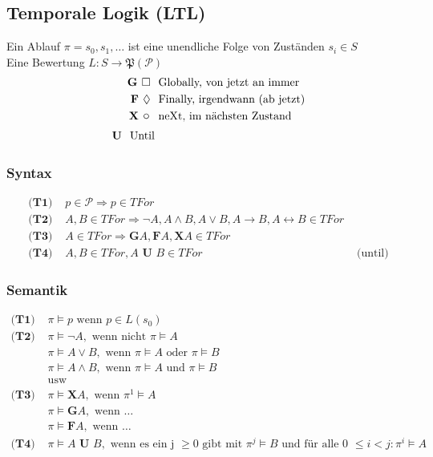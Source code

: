 \documentclass{article}
\begin{document}
		\subsection*{Temporale Logik (LTL)}
			Ein Ablauf $\pi = s_0, s_1, \ldots$ ist eine unendliche Folge von Zust\"anden $s_i \in S$\\
			Eine Bewertung $L: S \rightarrow \mathfrak{P}(\mathcal{P})$
				\begin{align*}
					\textbf{G $\Box$ } & \text{ Globally, von jetzt an immer}\\
					\textbf{F $\Diamond$ } & \text{ Finally, irgendwann (ab jetzt)}\\
					\textbf{X \large{$\circ$} } & \text{ neXt, im n\"achsten Zustand}\\
					\textbf{U } \text{ Until}
				\end{align*}
				\subsubsection*{Syntax}
					\begin{align*}
						\textbf{(T1) } & p \in \mathcal{P} \Rightarrow p \in TFor\\
						\textbf{(T2) } & A, B \in TFor \Rightarrow \neg A, A \wedge B, A \vee B, A \rightarrow B, A \leftrightarrow B \in TFor\\
						\textbf{(T3) } & A \in TFor \Rightarrow \textbf{G}A, \textbf{F}A, \textbf{X}A \in TFor\\
						\textbf{(T4) } & A, B \in TFor, A \textbf{ U } B \in TFor & \text{ (until)}
					\end{align*}
				\subsubsection*{Semantik}
					\begin{align*}
						\textbf{(T1) } & \pi \models p \text{ wenn } p \in L(s_0)\\
						\textbf{(T2) } & \pi \models \neg A, \text{ wenn nicht } \pi \models A\\
						& \pi \models A \vee B, \text{ wenn } \pi \models A \text{ oder } \pi \models B\\
						& \pi \models A \wedge B, \text{ wenn } \pi \models A \text{ und } \pi \models B\\
						& \text{usw}\\
						\textbf{(T3) } & \pi \models \textbf{X}A, \text{ wenn } \pi^1 \models A\\
						& \pi \models \textbf{G}A, \text{ wenn } \ldots\\
						& \pi \models \textbf{F}A, \text{ wenn } \ldots\\
						\textbf{(T4) } & \pi \models A \textbf{ U } B, \text{ wenn es ein j } \geq 0 \text{ gibt mit } \pi^j \models B \text{ und f\"ur alle 0 } \leq i < j: \pi^i \models A
					\end{align*}
\end{document}
